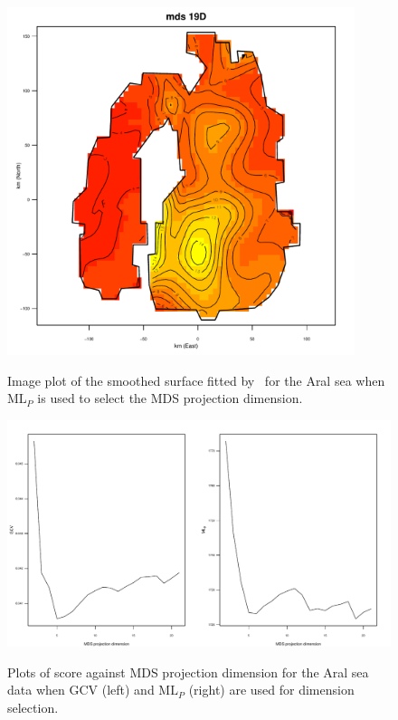 \begin{figure}[t]
\centering
\includegraphics[width=4in]{gds/figs/aral-19d.pdf} \\
\caption{Image plot of the smoothed surface fitted by \mdsds\ for the Aral sea when $\text{ML}_P$ is used to select the MDS projection dimension.}
\label{gds-aral-19d}
\end{figure}

\begin{figure}
\centering
\includegraphics[width=6in]{gds/figs/aral-dim-scores.pdf} \\
\caption{Plots of score against MDS projection dimension for the Aral sea data when GCV (left) and $\text{ML}_P$ (right) are used for dimension selection.}
\label{gds-aral-dim-select}
\end{figure}

